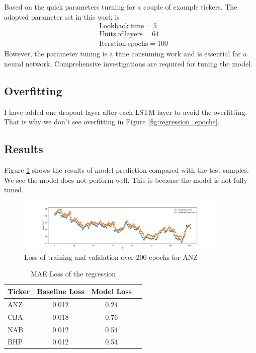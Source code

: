 \documentclass[a4paper, 11pt, usenatbib]{article}
\begin{document}
Based on the quick parameters turning for a couple of example tickers. The adopted parameter set in this work is
\begin{align*}
&\mathrm{Lookback\ time} = 5 \\
&\mathrm{Units\ of\ layers} = 64 \\
&\mathrm{Iteration\ epochs} = 100 
\end{align*}
However, the parameter tuning is a time consuming work and is essential for a neural network. Comprehensive investigations are required for tuning the model.

\subsection{Overfitting}
I have added one dropout layer after each LSTM layer to avoid the overfitting. That is why we don't see overfitting in Figure \ref{fig:regression_epochs}. 

\subsection{Results}

Figure \ref{fig:regression_test} shows the results of model prediction compared with the test samples. We see the model does not perform well.
This is because the model is not fully tuned. 
\begin{figure}
	\centering
	\includegraphics[width=0.9\textwidth]{./figures/regression_test.pdf}
	\caption[]
	{Loss of training and validation over 200 epochs for ANZ}
		\label{fig:regression_test}
\end{figure}

\begin{table}
 \caption{MAE Loss of the regression}
 \label{tab:regression_loss}
 \centering
 \begin{tabular}
 { l  c  c  l }
  \hline
 Ticker & Baseline Loss & Model Loss\\
 \hline
 ANZ & 0.012 & 0.24 \\
 CBA & 0.018 & 0.76 \\
 NAB & 0.012 & 0.54\\
 BHP & 0.012 & 0.54 &\\

  \hline
 \end{tabular}
\end{table}  
\end{document}
